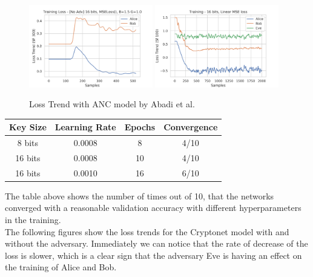 \documentclass[a4paper]{article}
\begin{document}
  \begin{figure}[H]
    \centering
    \includegraphics[width=0.48\textwidth]{../../models/cryptonet/graphs/loss_1E64x256v17.png}
    \includegraphics[width=0.48\textwidth]{../../models/anc/graphs/loss_1E2000v6.png}
    \caption{Loss Trend with ANC model by Abadi et al.}
    \label{fig:res_anc}
  \end{figure}

  \begin{center}
    \begin{tabular}{ c c c c }
      \hline
      \textbf{Key Size} & \textbf{Learning Rate} & \textbf{Epochs} & \textbf{Convergence} \\ \hline
      8 bits            & 0.0008                 & 8               & 4/10                 \\
      16 bits           & 0.0008                 & 10              & 4/10                 \\
      16 bits           & 0.0010                 & 16              & 6/10                 \\
      \hline
    \end{tabular}
  \end{center}
    
  The table above shows the number of times out of 10, that the networks converged with a 
  reasonable validation accuracy with different hyperparameters in the training.\\

  The following figures show the loss trends for the Cryptonet model with and without the adversary.
  Immediately we can notice that the rate of decrease of the loss is slower, which is a clear sign that
  the adversary Eve is having an effect on the training of Alice and Bob.
\end{document}
